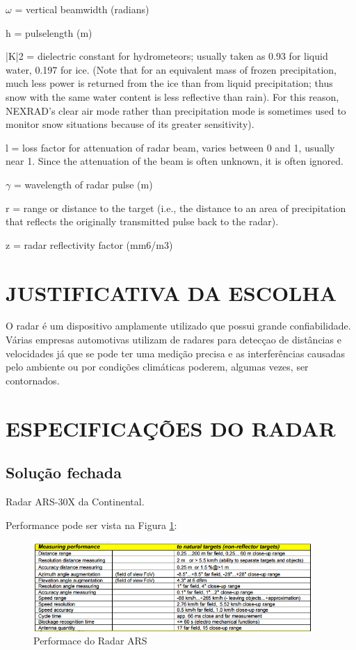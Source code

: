 $\omega$ = vertical beamwidth (radians)

h = pulselength (m)

|K|2 = dielectric constant for hydrometeors; usually taken as 0.93 for liquid water, 0.197 for
 ice. (Note that for an equivalent mass of frozen precipitation, much less power is returned
 from the ice than from liquid precipitation; thus snow with the same water content is
  less reflective than rain). For this reason, NEXRAD’s clear air mode rather than
  precipitation mode is sometimes used to monitor snow situations because of its greater
  sensitivity).

l = loss factor for attenuation of radar beam, varies between 0 and 1, usually near 1.
 Since the attenuation of the beam is often unknown, it is often ignored.

$\gamma$ = wavelength of radar pulse (m)

r = range or distance to the target (i.e., the distance to an area of precipitation that reflects the originally transmitted pulse back to the radar).

z = radar reflectivity factor (mm6/m3)

\section{JUSTIFICATIVA DA ESCOLHA}

O radar é um dispositivo amplamente utilizado que possui grande confiabilidade. Várias empresas automotivas utilizam de radares para detecçao de distâncias e velocidades já que se pode ter uma medição precisa e as interferências causadas pelo ambiente ou por condições climáticas poderem, algumas vezes, ser contornados.

\section{ESPECIFICAÇÕES DO RADAR}

\subsection{Solução fechada}

Radar ARS-30X da Continental.

Performance pode ser vista na Figura \ref{fig:performace_radar}:
\begin{figure}[h]
  \centering
  \includegraphics[width=400px, scale=1]{figuras/performace_radar}
  \caption{Performace do Radar ARS}
\label{fig:performace_radar}
\end{figure}


